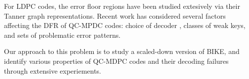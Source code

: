 For LDPC codes, the error floor regions have been studied extesively via their Tanner graph representations. Recent work \cite{Vasseur-thesis,Vasseur:2021:eprint} has considered several factors affecting the DFR of QC-MPDC codes: choice of decoder \cite{tillich:2018:decoding,SV:2019:extrapolate}, classes of weak keys, and sets of problematic error patterns.

Our approach to this problem is to study a scaled-down version of BIKE, and identify various properties of QC-MDPC codes and their decoding failures through extensive experiements.